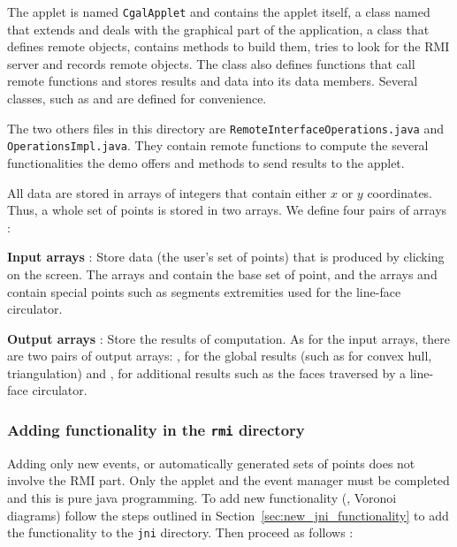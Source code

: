 The applet is named \texttt{CgalApplet} and contains the applet
itself, a class named  that extends  and deals 
with the graphical part of the application, a class  that defines 
remote objects, contains methods to build them, tries to look for the RMI 
server and records remote objects. The  class also defines 
functions that call remote functions and stores results and data into its 
data members. Several classes, such as  and 
are defined for convenience.

The two others files in this directory are \texttt{RemoteInterfaceOperations.java}
and \texttt{OperationsImpl.java}. They contain remote functions
to compute the several functionalities the demo offers and 
methods to send results to the applet.

All data are stored in arrays of integers that contain either $x$ or $y$
coordinates.  Thus, a whole set of points is stored in two arrays. We
define four pairs of arrays :

{\bf Input arrays } : Store data (the user's set of points) that is
produced by clicking on the screen. The arrays  and  
contain the base set of point, and the arrays  and  contain 
special points such as segments extremities used for the line-face circulator.

{\bf Output arrays } : Store the results of computation. As for the input
arrays, there are two pairs of output arrays:
,  for the global
results (such as for convex hull, triangulation) and 
,  for additional results such as the faces 
traversed by a line-face circulator. 

\subsubsection{Adding functionality in the \texttt{rmi} directory}
\label{sec:new_rmi_functionality}

Adding only new events, or automatically generated sets of points does
not involve the RMI part. Only the applet and the event manager must
be completed and this is pure java programming.  To add new
functionality (\eg, Voronoi diagrams) follow the steps outlined in
Section~\ref{sec:new_jni_functionality} to add the functionality to the
\texttt{jni} directory. Then proceed as follows :

